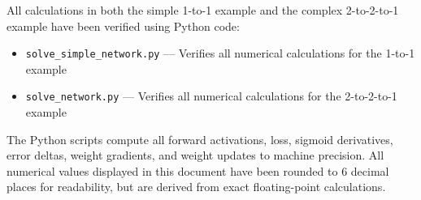 \documentclass[12pt]{article}
\begin{document}
All calculations in both the simple 1-to-1 example and the complex 2-to-2-to-1 example have been verified using Python code:
\begin{itemize}
    \item \texttt{solve\_simple\_network.py} — Verifies all numerical calculations for the 1-to-1 example
    \item \texttt{solve\_network.py} — Verifies all numerical calculations for the 2-to-2-to-1 example
\end{itemize}

The Python scripts compute all forward activations, loss, sigmoid derivatives, error deltas, weight gradients, and weight updates to machine precision. All numerical values displayed in this document have been rounded to 6 decimal places for readability, but are derived from exact floating-point calculations.
\end{document}
